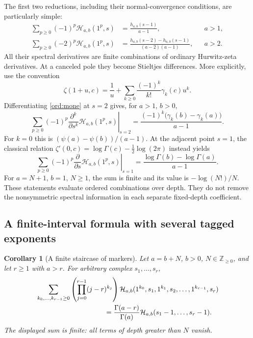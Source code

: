 \documentclass[11pt,a4paper]{article}
\numberwithin{equation}{section}
\newtheorem{corollary}[theorem]{Corollary}
\theoremstyle{definition}
\theoremstyle{remark}
\newcommand{\Hrel}{\mathcal H}
\begin{document}
The first two reductions, including their normal-convergence conditions,
are particularly simple:
\begin{align}
 \sum_{p\ge0}(-1)^p\Hrel_{a,b}(1^p,s)
    &=\frac{h_{a,b}(s-1)}{a-1}, && a>1, \label{ord:mone}\\
 \sum_{p\ge0}(-2)^p\Hrel_{a,b}(1^p,s)
    &=\frac{h_{a,b}(s-2)-h_{a,b}(s-1)}
            {(a-2)(a-1)}, && a>2. \label{ord:mtwo}
\end{align}
All their spectral derivatives are finite combinations of ordinary
Hurwitz-zeta derivatives.  At a canceled pole they become Stieltjes
differences.  More explicitly, use the convention
\[
 \zeta(1+u,c)=\frac1u+
       \sum_{k\ge0}\frac{(-1)^k}{k!}\gamma_k(c)u^k.
\]
Differentiating \eqref{ord:mone} at $s=2$ gives, for $a>1$, $b>0$,
\begin{equation}\label{ord:stieltjes}
 \boxed{\;
 \sum_{p\ge0}(-1)^p
    \left.\frac{\partial^k}{\partial s^k}
          \Hrel_{a,b}(1^p,s)\right|_{s=2}
  =\frac{(-1)^k\bigl(\gamma_k(b)-\gamma_k(a)\bigr)}{a-1}.
 \;}
\end{equation}
For $k=0$ this is $(\psi(a)-\psi(b))/(a-1)$.
At the adjacent point $s=1$, the classical relation
$\zeta'(0,c)=\log\Gamma(c)-\tfrac12\log(2\pi)$
\cite[\S25.11]{DLMF} instead yields
\begin{equation}\label{ord:gamma}
 \boxed{\;
 \sum_{p\ge0}(-1)^p
    \left.\frac{\partial}{\partial s}
          \Hrel_{a,b}(1^p,s)\right|_{s=1}
       =\frac{\log\Gamma(b)-\log\Gamma(a)}{a-1}.
 \;}
\end{equation}
For $a=N+1$, $b=1$, $N\ge1$, the sum is finite and its value is
$-\log(N!)/N$.  These statements evaluate ordered combinations over
depth.  They do not remove the nonsymmetric spectral information in
each separate fixed-depth coefficient.

\subsection{A finite-interval formula with several tagged exponents}

\begin{corollary}[A finite staircase of markers]\label{ord:staircase}
Let $a=b+N$, $b>0$, $N\in\mathbb Z_{\ge0}$, and let $r\ge1$ with
$a>r$.  For arbitrary complex $s_1,\ldots,s_r$,
\begin{equation}\label{ord:stairformula}
 \begin{split}
 &\sum_{k_0,\ldots,k_{r-1}\ge0}
       \left(\prod_{j=0}^{r-1}(j-r)^{k_j}\right)
       \Hrel_{a,b}(1^{k_0},s_1,1^{k_1},s_2,\ldots,
                                  1^{k_{r-1}},s_r)\\
 &\hspace{35mm}
       =\frac{\Gamma(a-r)}{\Gamma(a)}
                    \Hrel_{a,b}(s_1-1,\ldots,s_r-1).
 \end{split}
\end{equation}
The displayed sum is finite: all terms of depth greater than $N$ vanish.
\end{corollary}
\end{document}
